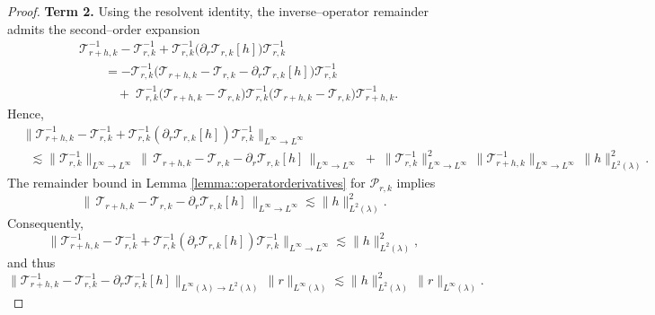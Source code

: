 \documentclass[11pt]{article}
\theoremstyle{plain}
\begin{document}
\begin{proof}
\medskip
\noindent \textbf{Term 2.}
Using the resolvent identity, the inverse–operator remainder admits the second–order expansion
\[
\begin{aligned}
&\mathcal{T}_{r+h,k}^{-1} - \mathcal{T}_{r,k}^{-1}
+ \mathcal{T}_{r,k}^{-1}\big(\partial_r \mathcal{T}_{r,k}[h]\big)\mathcal{T}_{r,k}^{-1} \\
&\qquad=- \mathcal{T}_{r,k}^{-1}\Big( \mathcal{T}_{r+h,k} - \mathcal{T}_{r,k} - \partial_r \mathcal{T}_{r,k}[h] \Big)\mathcal{T}_{r,k}^{-1} \\
&\qquad\quad +\; \mathcal{T}_{r,k}^{-1}\big(\mathcal{T}_{r+h,k} - \mathcal{T}_{r,k}\big)\mathcal{T}_{r,k}^{-1}\big(\mathcal{T}_{r+h,k} - \mathcal{T}_{r,k}\big)\mathcal{T}_{r+h,k}^{-1}.
\end{aligned}
\]
Hence,
\[
\begin{aligned}
& \big\|\mathcal{T}_{r+h,k}^{-1} - \mathcal{T}_{r,k}^{-1}
+ \mathcal{T}_{r,k}^{-1}(\partial_r \mathcal{T}_{r,k}[h])\mathcal{T}_{r,k}^{-1}\big\|_{L^\infty \to L^\infty} \\
&\;\;\lesssim \|\mathcal{T}_{r,k}^{-1}\|_{L^\infty \to L^\infty}\,
   \big\|\,\mathcal{T}_{r+h,k} - \mathcal{T}_{r,k} - \partial_r \mathcal{T}_{r,k}[h]\,\big\|_{L^\infty \to L^\infty}
   \;+\; \|\mathcal{T}_{r,k}^{-1}\|_{L^\infty \to L^\infty}^2\,
   \|\mathcal{T}_{r+h,k}^{-1}\|_{L^\infty \to L^\infty}\,\|h\|_{L^2(\lambda)}^2 .
\end{aligned}
\]
The remainder bound in Lemma \ref{lemma::operatorderivatives} for $\mathcal{P}_{r,k}$ implies
\[
\big\|\,\mathcal{T}_{r+h,k} - \mathcal{T}_{r,k} - \partial_r \mathcal{T}_{r,k}[h]\,\big\|_{L^\infty \to L^\infty} \lesssim \|h\|_{L^2(\lambda)}^2.
\]
Consequently,
\[
\big\|\mathcal{T}_{r+h,k}^{-1} - \mathcal{T}_{r,k}^{-1}
+ \mathcal{T}_{r,k}^{-1}(\partial_r \mathcal{T}_{r,k}[h])\mathcal{T}_{r,k}^{-1}\big\|_{L^\infty \to L^\infty} \lesssim \|h\|_{L^2(\lambda)}^2,
\]
and thus
\[
\big\|\mathcal{T}_{r+h,k}^{-1}-\mathcal{T}_{r,k}^{-1}-\partial_r \mathcal{T}_{r,k}^{-1}[h]\big\|_{L^\infty(\lambda) \to L^2(\lambda)} \,\|r\|_{L^\infty(\lambda)} \lesssim \|h\|_{L^2(\lambda)}^2 \,\|r\|_{L^\infty(\lambda)}.
\]


\end{proof}
\end{document}
